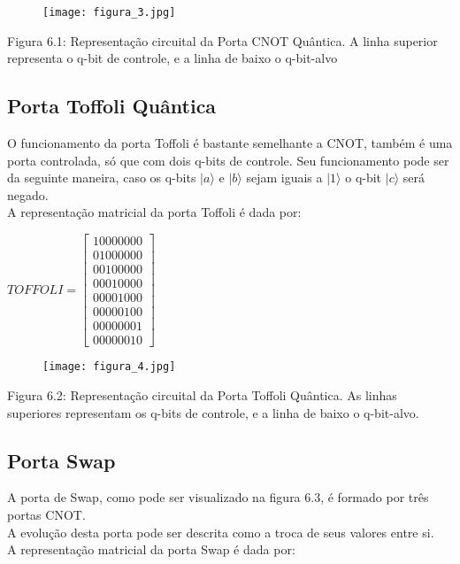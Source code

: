 \documentclass[12pt, a4paper, oneside]{article}
\begin{document}
\begin{figure}
\centering 
\texttt{[image: figura\_3.jpg]} 
\end{figure}

\noindent Figura 6.1: Representação circuital da Porta CNOT Quântica. A linha superior representa o
q-bit de controle, e a linha de baixo o q-bit-alvo

\subsection{Porta Toffoli Quântica}

\par O funcionamento da porta Toffoli é bastante semelhante a CNOT, também é uma porta
controlada, só que com dois q-bits de controle. Seu funcionamento pode ser da seguinte
maneira, caso os q-bits $| a \rangle$ e $| b \rangle$ sejam iguais a $| 1 \rangle$ o q-bit $| c \rangle$ será negado.\\
A representação matricial da porta Toffoli é dada por:\\
\begin{center}
$
TOFFOLI = \left[
\begin{array}{cccccccc}
1 0 0 0 0 0 0 0\\
0 1 0 0 0 0 0 0\\
0 0 1 0 0 0 0 0\\
0 0 0 1 0 0 0 0\\
0 0 0 0 1 0 0 0\\
0 0 0 0 0 1 0 0\\
0 0 0 0 0 0 0 1\\
0 0 0 0 0 0 1 0
\end{array}
\right]
$
\end{center}
\newpage


\begin{figure}
\centering 
\texttt{[image: figura\_4.jpg]} 
\end{figure}

\noindent Figura 6.2: Representação circuital da Porta Toffoli Quântica. As linhas superiores representam
os q-bits de controle, e a linha de baixo o q-bit-alvo.\\

\subsection{Porta Swap}

\par A porta de Swap, como pode ser visualizado na figura 6.3, é formado por três portas
CNOT.\\
A evolução desta porta pode ser descrita como a troca de seus valores entre si.\\
A representação matricial da porta Swap é dada por:\\
\end{document}
